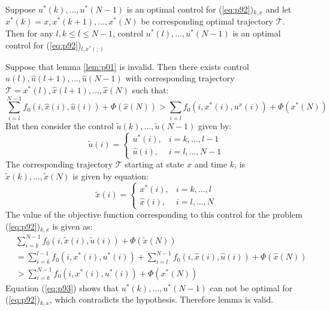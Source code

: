 \begin{lemma}\label{lem:p01}
Suppose $u^*(k),\dots,u^*(N-1)$ is an optimal control for (\ref{eq:p92})$_{k,x}$ and let $x^*(k) = x,x^*(k+1),\dots,x^*(N)$ be corresponding optimal trajectory $\mathscr{T}$. \\
Then for any $l,k \le l \le N-1$, control $u^*(l),\dots,u^*(N-1)$ is an optimal control for (\ref{eq:p92})$_{l,x^*(;)}$
\end{lemma}
\begin{dokaz}
Suppose that lemma \ref{lem:p01} is invalid. Then there exists control $\hat{u}(l),\hat{u}(l+1),\dots,\hat{u}(N-1)$ with corresponding trajectory $\mathscr{T} = x^*(l),\hat{x}(l+1),\dots,\hat{x}(N)$ such that:
\begin{equation}\label{eq:p93}
    \sum_{i=l}^{N-1} f_0(i,\hat{x}(i),\hat{u}(i)) + \Phi(\hat{x}(N)) > \sum_{i=l} f_0(i,x^*(i),u^x(i)) + \Phi(x^*(N))
\end{equation}
\noindent But then consider the control $\tilde{u}(k),\dots,\tilde{u}(N-1)$ given by:
\begin{equation}
    \tilde{u}(i)=
    \begin{cases}
        u^*(i), & i=k,\dots,l-1\\
        \hat{u}(i), & i=l,\dots,N-1
    \end{cases}
\end{equation}
\noindent The corresponding trajectory $\mathscr{T}$ starting at state $x$ and time $k$, is $\tilde{x}(k),\dots,\tilde{x}(N)$ is given by equation:
\begin{equation}
    \tilde{x}(i)=
    \begin{cases}
        x^*(i), & i=k,\dots,l\\
        \hat{x}(i), & i=l,\dots,N
    \end{cases}
\end{equation}
\noindent The value of the objective function corresponding to this control for the problem (\ref{eq:p92})$_{k,x}$ is given as:
\begin{equation}
    \begin{split}
        &\sum_{i=k}^{N-1} f_0(i,\tilde{x}(i),\tilde{u}(i))+ \Phi(\tilde{x}(N))\\
        & = \sum_{i=k}^{l-1} f_0(i,x^*(i),u^*(i)) + \sum_{i=l}^{N-1} f_0(i,\hat{x}(i),\hat{u}(i)) + \Phi(\hat{x}(N))\\
        & > \sum_{i=k}^{N-1} f_0(i,x^*(i),u^*(i)) + \Phi(x^*(N))
    \end{split}
\end{equation}
\noindent Equation (\ref{eq:p93}) shows that $u^*(k),\dots,u^*(N-1)$ can not be optimal for (\ref{eq:p92})$_{k,x}$, which contradicts the hypothesis. Therefore lemma is valid.
\end{dokaz}

